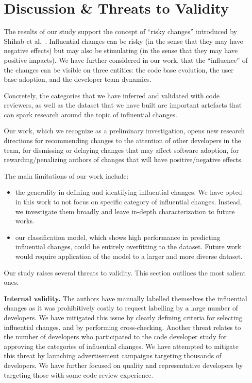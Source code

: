\section{Discussion \& Threats to Validity}
\label{sec:discussion}

The results of our study support the concept of ``risky changes'' introduced by Shihab et al.~\cite{shihab_industrial_2012}.
Influential changes can be risky (in the sense that they may have negative effects) but may also be stimulating (in the sense that
they may have positive impacts). We have further considered in our work, that the ``influence'' of the changes can be
visible on three entities: the code base evolution, the user base adoption, and the developer team dynamics.

Concretely, the categories that we have inferred and validated with code reviewers, as well as the dataset that
we have built are important artefacts that can spark research around the topic of influential changes.

Our work, which we recognize as a preliminary investigation, opens new research directions for
recommending changes to the attention of other developers in the team, for dismissing or delaying changes that may
affect software adoption, for rewarding/penalizing authors of changes that will have positive/negative effects.

The main limitations of our work include:
\begin{itemize}
	\item the generality in defining and identifying influential changes. We have opted in this work to not focus on specific category of influential changes. Instead, we investigate them broadly and leave in-depth characterization to future works.
	\item our classification model, which shows high performance in predicting influential changes, could be entirely overfitting to  the dataset. Future work would require application of the model to a larger and more diverse dataset.
\end{itemize}

Our study raises several threats to validity. This section outlines the most salient ones.

\textbf{Internal validity.} The authors have manually labelled themselves the influential changes as it
was prohibitively costly to request labelling by a large number of developers. We have mitigated this issue
by clearly defining criteria for selecting influential changes, and by performing cross-checking.
Another threat relates to the number of developers who participated to the code developer study for
approving the categories of influential changes. We have attempted to mitigate this threat by launching
advertisement campaigns targeting thousands of developers. We have further focused on quality and representative 
developers by targeting those with some code review experience.

